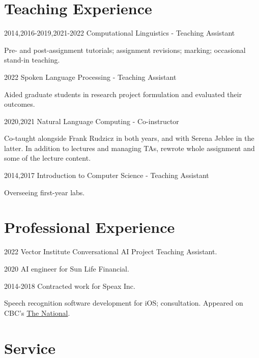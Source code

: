 \documentclass{article}
\begin{document}
\section{Teaching Experience}
\begin{CV}
  
  \item[2014,2016-2019,2021-2022] Computational Linguistics - Teaching Assistant

    Pre- and post-assignment tutorials; assignment revisions; marking;
    occasional stand-in teaching.

  \item[2022] Spoken Language Processing - Teaching Assistant

    Aided graduate students in research project formulation and evaluated their
    outcomes.

  \item[2020,2021] Natural Language Computing - Co-instructor

    Co-taught alongside Frank Rudzicz in both years, and with Serena Jeblee in
    the latter. In addition to lectures and managing TAs, rewrote whole
    assignment and some of the lecture content.

  \item[2014,2017] Introduction to Computer Science - Teaching Assistant

    Overseeing first-year labs.

\end{CV}

\section{Professional Experience}

\begin{CV}
  \item[2022] Vector Institute Conversational AI Project Teaching Assistant.
  \item[2020] AI engineer for Sun Life Financial.
  \item[2014-2018] Contracted work for Speax Inc.

    Speech recognition software development for iOS; consultation. Appeared on
    CBC's \href{https://www.cbc.ca/player/play/1418433091867/}{The National}.

\end{CV}

\section{Service}
\end{document}
